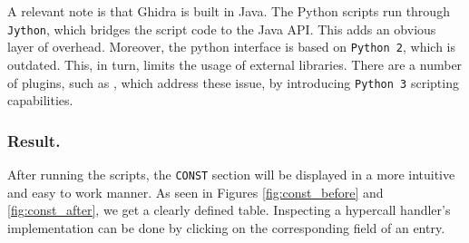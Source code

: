 \documentclass[runningheads]{llncs}
\newcommand{\cc}{\lstinline[mathescape]}
\begin{document}
A relevant note is that Ghidra is built in Java. The Python scripts run through
\cc{Jython}, which bridges the script code to the Java API. This adds an
obvious layer of overhead. Moreover, the python interface is based on
\cc{Python 2}, which is outdated. This, in turn, limits the usage of external
libraries. There are a number of plugins, such as \cite{ghidrathon}, which
address these issue, by introducing \cc{Python 3} scripting capabilities.

\vspace{-3mm}
\subsubsection{Result.}

After running the scripts, the \cc{CONST} section will be displayed in a more
intuitive and easy to work manner. As seen in Figures \ref{fig:const_before}
and \ref{fig:const_after}, we get a clearly defined table. Inspecting a 
hypercall handler's implementation can be done by clicking on the corresponding
field of an entry.
\end{document}
